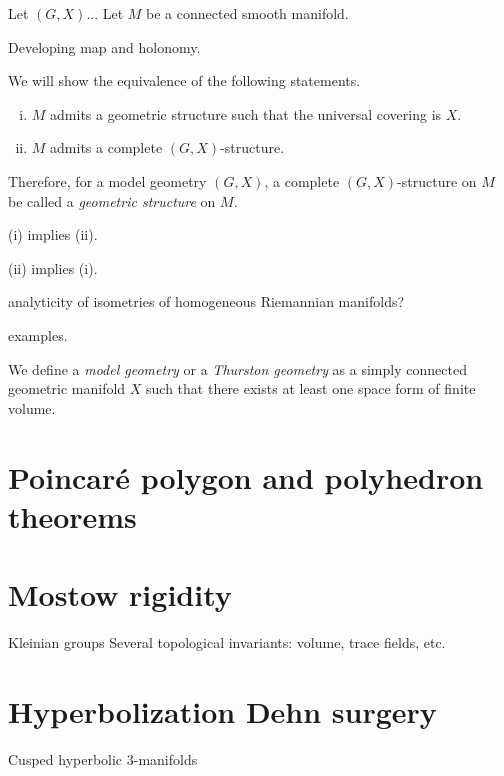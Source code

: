 \documentclass{../note}
\begin{document}
\begin{prb}
Let $(G,X)$...
Let $M$ be a connected smooth manifold.

Developing map and holonomy.

We will show the equivalence of the following statements.
\begin{enumerate}[(i)]
\item $M$ admits a geometric structure such that the universal covering is $X$.
\item $M$ admits a complete $(G,X)$-structure.
\end{enumerate}
Therefore, for a model geometry $(G,X)$, a complete $(G,X)$-structure on $M$ be called a \emph{geometric structure} on $M$.
\begin{parts}
\item (i) implies (ii).
\item (ii) implies (i).
\end{parts}
\end{prb}

analyticity of isometries of homogeneous Riemannian manifolds?

examples.

\begin{prb}
We define a \emph{model geometry} or a \emph{Thurston geometry} as a simply connected geometric manifold $X$ such that there exists at least one space form of finite volume.
\end{prb}

\section{Poincar\'e polygon and polyhedron theorems}



\section{Mostow rigidity}
Kleinian groups
Several topological invariants: volume, trace fields, etc.


\section{Hyperbolization Dehn surgery}

\begin{prb}
Cusped hyperbolic 3-manifolds
\end{prb}
\end{document}
